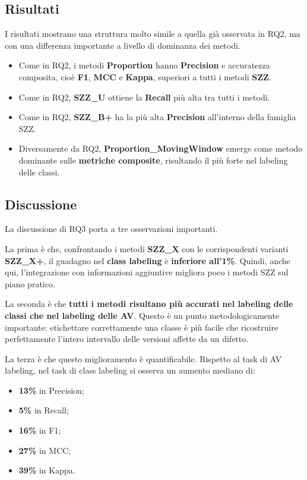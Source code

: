 \subsection{Risultati}

I risultati mostrano una struttura molto simile a quella già osservata in RQ2, ma con una differenza importante a livello di dominanza dei metodi.

\begin{itemize}
    \item Come in RQ2, i metodi \textbf{Proportion} hanno \textbf{Precision} e accuratezza composita, cioè \textbf{F1}, \textbf{MCC} e \textbf{Kappa}, superiori a tutti i metodi \textbf{SZZ}.
    \item Come in RQ2, \textbf{SZZ\_U} ottiene la \textbf{Recall} più alta tra tutti i metodi.
    \item Come in RQ2, \textbf{SZZ\_B+} ha la più alta \textbf{Precision} all'interno della famiglia SZZ.
    \item Diversamente da RQ2, \textbf{Proportion\_MovingWindow} emerge come metodo dominante sulle \textbf{metriche composite}, risultando il più forte nel labeling delle classi.
\end{itemize}

\subsection{Discussione}

La discussione di RQ3 porta a tre osservazioni importanti.

La prima è che, confrontando i metodi \textbf{SZZ\_X} con le corrispondenti varianti \textbf{SZZ\_X+}, il guadagno nel \textbf{class labeling} è \textbf{inferiore all'1\%}. Quindi, anche qui, l'integrazione con informazioni aggiuntive migliora poco i metodi SZZ sul piano pratico.

La seconda è che \textbf{tutti i metodi risultano più accurati nel labeling delle classi che nel labeling delle AV}. Questo è un punto metodologicamente importante: etichettare correttamente una classe è più facile che ricostruire perfettamente l'intero intervallo delle versioni affette da un difetto.

La terza è che questo miglioramento è quantificabile. Rispetto al task di AV labeling, nel task di class labeling si osserva un aumento mediano di:

\begin{itemize}
    \item \textbf{13\%} in Precision;
    \item \textbf{5\%} in Recall;
    \item \textbf{16\%} in F1;
    \item \textbf{27\%} in MCC;
    \item \textbf{39\%} in Kappa.
\end{itemize}

